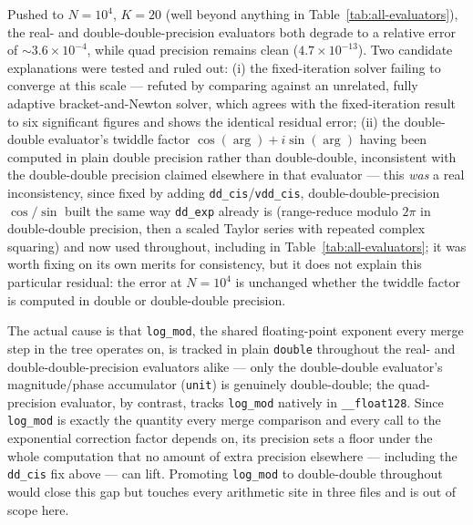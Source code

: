 \documentclass[11pt]{article}
\begin{document}
Pushed to $N=10^4$, $K=20$ (well beyond anything in Table~\ref{tab:all-evaluators}), the
real- and double-double-precision evaluators both degrade to a relative error of
$\sim 3.6\times10^{-4}$, while quad precision remains clean
($4.7\times10^{-13}$). Two candidate explanations were tested and ruled out: (i) the
fixed-iteration solver failing to converge at this scale --- refuted by comparing
against an unrelated, fully adaptive bracket-and-Newton solver, which agrees with the
fixed-iteration result to six significant figures and shows the identical residual
error; (ii) the double-double evaluator's twiddle factor $\cos(\arg)+i\sin(\arg)$ having
been computed in plain double precision rather than double-double, inconsistent with
the double-double precision claimed elsewhere in that evaluator --- this \emph{was} a
real inconsistency, since fixed by adding \texttt{dd\_cis}/\texttt{vdd\_cis},
double-double-precision $\cos/\sin$ built the same way \texttt{dd\_exp} already is
(range-reduce modulo $2\pi$ in double-double precision, then a scaled Taylor series with
repeated complex squaring) and now used throughout, including in
Table~\ref{tab:all-evaluators}; it was worth fixing on its own merits for consistency,
but it does not explain this particular residual: the error at $N=10^4$ is unchanged
whether the twiddle factor is computed in double or double-double precision.

The actual cause is that \texttt{log\_mod}, the shared floating-point exponent every
merge step in the tree operates on, is tracked in plain \texttt{double} throughout the
real- and double-double-precision evaluators alike --- only the double-double
evaluator's magnitude/phase accumulator (\texttt{unit}) is genuinely double-double; the
quad-precision evaluator, by contrast, tracks \texttt{log\_mod} natively in
\texttt{\_\_float128}. Since \texttt{log\_mod} is exactly the quantity every merge
comparison and every call to the exponential correction factor depends on, its precision
sets a floor under the whole computation that no amount of extra precision elsewhere ---
including the \texttt{dd\_cis} fix above --- can lift. Promoting \texttt{log\_mod} to
double-double throughout would close this gap but touches every arithmetic site in three
files and is out of scope here.
\end{document}
